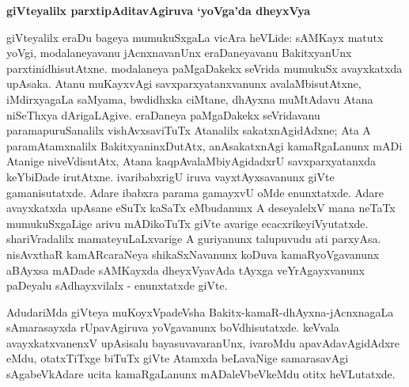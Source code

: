 \newpage

\begin{center}
\textbf{\Large{giVteyalilx parxtipAditavAgiruva `yoVga'da dheyxVya}}
\end{center}

giVteyalilx eraDu bageya mumukuSxgaLa vicAra heVLide: sAMKayx matutx yoVgi, modalaneyavanu jAcnxnavanUnx eraDaneyavanu BakitxyanUnx parxtinidhisutAtxne. modalaneya paMgaDakekx seVrida mumukuSx avayxkatxda upAsaka. Atanu muKayxvAgi savxparxyatanxvanunx avalaMbisutAtxne, iMdirxyagaLa saMyama, bwdidhxka ciMtane, dhAyxna muMtAdavu Atana niSeThxya dArigaLAgive. eraDaneya paMgaDakekx seVridavanu paramapuruSanalilx vishAvxsaviTuTx Atanalilx sakatxnAgidAdxne; Ata A paramAtamxnalilx BakitxyaninxDutAtx, anAsakatxnAgi kamaRgaLanunx mADi Atanige niveVdisutAtx, Atana kaqpAvalaMbiyAgidadxrU savxparxyatanxda keYbiDade irutAtxne. ivaribabxrigU iruva vayxtAyxsavanunx giVte gamanisutatxde. Adare ibabxra parama gamayxvU oMde enunxtatxde. Adare avayxkatxda upAsane eSuTx kaSaTx eMbudanunx A deseyalelxV mana neTaTx mumukuSxgaLige arivu mADikoTuTx giVte avarige ecacxrikeyiVyutatxde. shariVradalilx mamateyuLaLxvarige A guriyanunx talupuvudu ati parxyAsa. nisAvxthaR kamARcaraNeya shikaSxNavanunx koDuva kamaRyoVgavanunx aBAyxsa mADade sAMKayxda dheyxVyavAda tAyxga veYrAgayxvanunx paDeyalu sAdhayxvilalx - enunxtatxde giVte.

AdudariMda giVteya muKoyxVpadeVsha Bakitx-kamaR-dhAyxna-jAcnxnagaLa sAmarasayxda rUpavAgiruva yoVgavanunx boVdhisutatxde. keVvala avayxkatxvanenxV upAsisalu bayasuvavaranUnx, ivaroMdu apavAdavAgidAdxre eMdu, otatxTiTxge biTuTx giVte Atamxda beLavaNige samarasavAgi sAgabeVkAdare ucita kamaRgaLanunx mADaleVbeVkeMdu otitx heVLutatxde.

